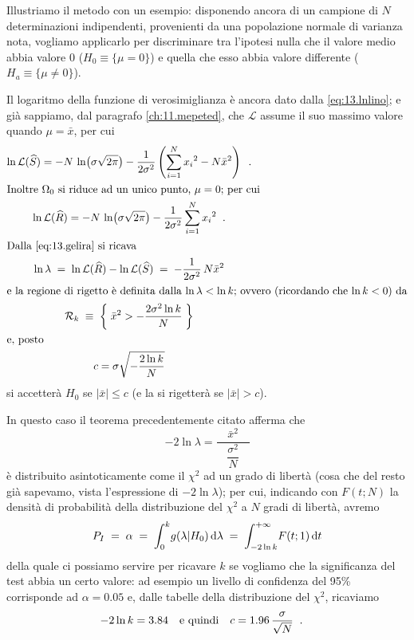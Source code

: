 Illustriamo il metodo con un esempio: disponendo ancora di
un campione di $N$ determinazioni indipendenti, provenienti
da una popolazione normale di varianza nota, vogliamo
applicarlo per discriminare tra l'ipotesi nulla che il valore
medio abbia valore 0 ($H_0 \equiv \{ \mu = 0 \}$) e quella
che esso abbia valore differente ($H_a \equiv \{ \mu \ne 0
\}$).

Il logaritmo della funzione di verosimiglianza \`e ancora
dato dalla \eqref{eq:13.lnlino}; e gi\`a sappiamo, dal
paragrafo \ref{ch:11.mepeted}, che $\mathcal{L}$ assume il
suo massimo valore quando $\mu = \bar x$, per cui
\begin{gather*}
  \ln \mathcal{L} (\widehat S) = - N \, \ln \bigl( \sigma
    \sqrt{2 \pi} \bigr) - \frac{1}{2 \sigma^2} \left(
    \sum_{i=1}^N {x_i}^2 - N \bar x^2 \right) \;\; . \\
  \intertext{Inoltre $\Omega_0$ si riduce ad un unico punto,
    $\mu = 0$; per cui}
  \ln \mathcal{L} (\widehat R) = - N \, \ln \bigl( \sigma
    \sqrt{2 \pi} \bigr) - \frac{1}{2 \sigma^2} \sum_{i=1}^N
    {x_i}^2 \;\; . \\
  \intertext{Dalla \eqref{eq:13.gelira} si ricava}
  \ln \lambda \; = \; \ln \mathcal{L} (\widehat R) - \ln
    \mathcal{L} (\widehat S) \; = \; - \frac{1}{2 \sigma^2} \, N
    \bar x^2 \\
  \intertext{e la regione di rigetto \`e definita dalla $\ln
    \lambda < \ln k$; ovvero (ricordando che $\ln k < 0$) da}
  \mathcal{R}_k \; \equiv \; \left\{ \; \bar x^2 > - \frac{2
    \sigma^2 \ln k}{N} \; \right\} \\
  \intertext{e, posto}
  c = \sigma \sqrt{- \frac{2 \ln k}{N}}
\end{gather*}
si accetter\`a $H_0$ se $| \bar x | \le c$ (e la si
rigetter\`a se $| \bar x | > c$).

In questo caso il teorema precedentemente citato afferma che
\begin{equation*}
  - 2 \ln \lambda = \frac{\phantom{M} \bar x^2
    \phantom{M}}{\dfrac{\sigma^2}{N}}
\end{equation*}
\`e distribuito asintoticamente come il $\chi^2$ ad un grado
di libert\`a (cosa che del resto gi\`a sapevamo, vista
l'espressione di $- 2 \ln \lambda$); per cui, indicando con
$F(t; N)$ la densit\`a di probabilit\`a della distribuzione
del $\chi^2$ a $N$ gradi di libert\`a, avremo
\begin{equation*}
  P_I \; = \; \alpha \; = \; \int_0^k \! g( \lambda | H_0 )
    \, \mathrm{d} \lambda \; = \; \int_{- 2 \ln k}^{+\infty} \!
    F(t; 1) \, \mathrm{d} t
\end{equation*}
della quale ci possiamo servire per ricavare $k$ se vogliamo
che la significanza del test abbia un certo valore: ad
esempio un livello di confidenza del 95\% corrisponde ad
$\alpha = 0.05$ e, dalle tabelle della distribuzione del
$\chi^2$, ricaviamo
\begin{align*}
  - 2 \ln k &= 3.84 &&\text{e quindi} & c &= 1.96 \,
    \frac{\sigma}{\sqrt{N}} \;\; .
\end{align*}

